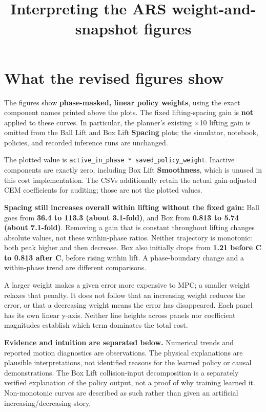 \documentclass[11pt,a4paper]{article}
\title{Interpreting the ARS weight-and-snapshot figures}
\author{}
\date{}
\begin{document}
\maketitle

\section{What the revised figures show}

The figures show \textbf{phase-masked, linear policy weights}, using the exact component names printed above the plots. The fixed lifting-spacing gain is \textbf{not} applied to these curves. In particular, the planner's existing \(\times\)10 lifting gain is omitted from the Ball Lift and Box Lift \textbf{Spacing} plots; the simulator, notebook, policies, and recorded inference runs are unchanged.

The plotted value is \texttt{active\_in\_phase * saved\_policy\_weight}. Inactive components are exactly zero, including Box Lift \textbf{Smoothness}, which is unused in this cost implementation. The CSVs additionally retain the actual gain-adjusted CEM coefficients for auditing; those are not the plotted values.

\textbf{Spacing still increases overall within lifting without the fixed gain:} Ball goes from \textbf{36.4 to 113.3 (about 3.1-fold)}, and Box from \textbf{0.813 to 5.74 (about 7.1-fold)}. Removing a gain that is constant throughout lifting changes absolute values, not these within-phase ratios. Neither trajectory is monotonic: both peak higher and then decrease. Box also initially drops from \textbf{1.21 before C to 0.813 after C}, before rising within lift. A phase-boundary change and a within-phase trend are different comparisons.

A larger weight makes a given error more expensive to MPC; a smaller weight relaxes that penalty. It does not follow that an increasing weight reduces the error, or that a decreasing weight means the error has disappeared. Each panel has its own linear y-axis. Neither line heights across panels nor coefficient magnitudes establish which term dominates the total cost.

\textbf{Evidence and intuition are separated below.} Numerical trends and reported motion diagnostics are observations. The physical explanations are plausible interpretations, not identified reasons for the learned policy or causal demonstrations. The Box Lift collision-input decomposition is a separately verified explanation of the policy output, not a proof of why training learned it. Non-monotonic curves are described as such rather than given an artificial increasing/decreasing story.
\end{document}
